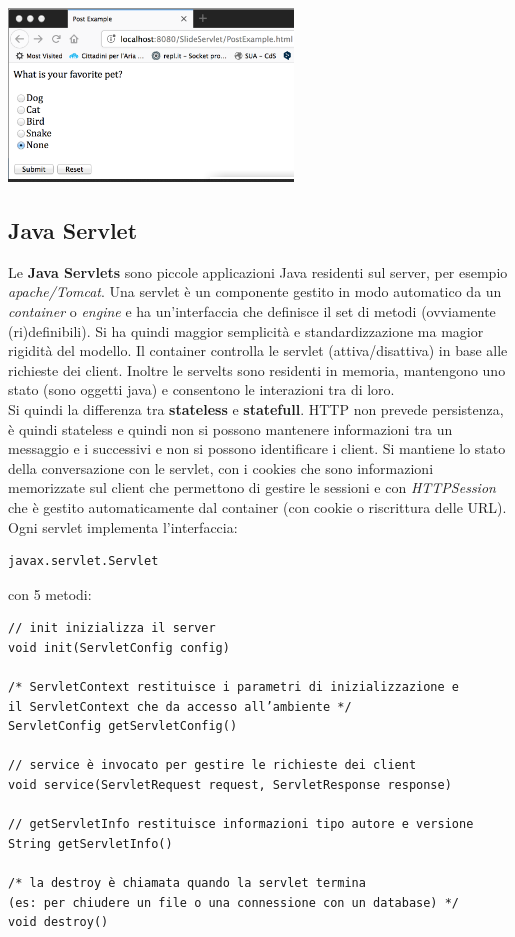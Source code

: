 \message{ !name(sd.tex)}\documentclass[a4paper,12pt, oneside]{book}
\begin{document}
\begin{center}
	\includegraphics[scale=0.7]{img/form.png}
\end{center}
\subsection{Java Servlet}
Le \textbf{Java Servlets} sono piccole applicazioni Java residenti sul server, per esempio \textit{apache/Tomcat}. Una servlet è un componente gestito in modo automatico da un \textit{container} o \textit{engine} e ha un'interfaccia che definisce il set di metodi (ovviamente (ri)definibili). Si ha quindi maggior semplicità e standardizzazione ma magior rigidità del modello. Il container controlla le servlet (attiva/disattiva) in base alle richieste dei client. Inoltre le servelts sono residenti in memoria, mantengono uno stato (sono oggetti java) e consentono le interazioni tra di loro.\\
Si quindi la differenza tra \textbf{stateless} e \textbf{statefull}. HTTP non prevede persistenza, è quindi stateless e quindi non si possono mantenere informazioni tra un messaggio e i successivi e non si possono identificare i client. Si mantiene lo stato della conversazione con le servlet, con i cookies che sono informazioni memorizzate sul client che permettono di gestire le sessioni e con \textit{HTTPSession} che è gestito automaticamente dal container (con cookie o riscrittura delle URL).\\
Ogni servlet implementa l'interfaccia:
\begin{verbatim}
javax.servlet.Servlet
\end{verbatim}
con 5 metodi:
\begin{verbatim}
// init inizializza il server
void init(ServletConfig config) 

/* ServletContext restituisce i parametri di inizializzazione e 
il ServletContext che da accesso all’ambiente */
ServletConfig getServletConfig() 

// service è invocato per gestire le richieste dei client
void service(ServletRequest request, ServletResponse response) 

// getServletInfo restituisce informazioni tipo autore e versione 
String getServletInfo() 

/* la destroy è chiamata quando la servlet termina 
(es: per chiudere un file o una connessione con un database) */
void destroy()  
\end{verbatim}
\end{document}
